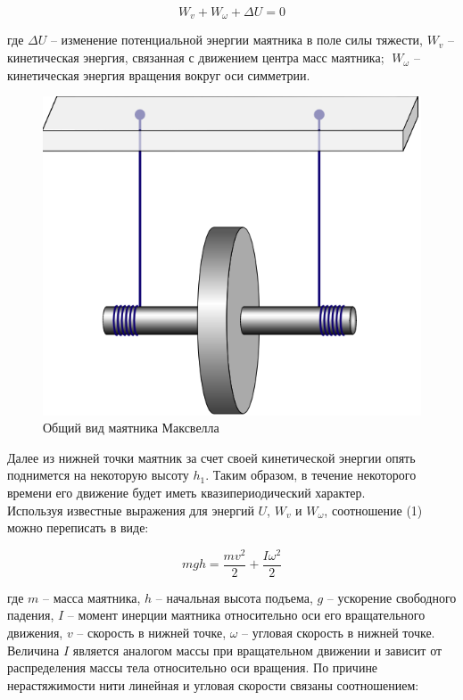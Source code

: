 \documentclass[a4paper]{article}
\begin{document}
\begin{equation}
    W_v+W_{\omega}+\Delta U=0
\end{equation}

где $\Delta U$ – изменение потенциальной энергии маятника в поле силы тяжести, $W_v$ – кинетическая энергия, связанная с движением центра масс маятника; $\; W_{\omega}$ – кинетическая энергия вращения вокруг оси симметрии.

\begin{figure}[h!]
    \centering
    \includegraphics[scale=0.5]{1.png}
    \caption{Общий вид маятника Максвелла}
\end{figure}

Далее из нижней точки маятник за счет своей кинетической
энергии опять поднимется на некоторую высоту $h_1$. Таким образом, в течение некоторого времени его движение будет иметь
квазипериодический характер.\\
Используя известные выражения для энергий $U$, $W_v$ и $W_{\omega}$,
соотношение (1) можно переписать в виде:

\begin{equation}
    mgh=\dfrac{mv^2}{2}+\dfrac{I\omega^2}{2}
\end{equation}



где $m$ – масса маятника, $h$ – начальная высота подъема, $g$ –
ускорение свободного падения, $I$ – момент инерции маятника
относительно оси его вращательного движения, $v$ – скорость в
нижней точке, $\omega$ – угловая скорость в нижней точке. Величина $I$ является аналогом массы при вращательном движении и зависит от распределения массы тела относительно оси вращения.
По причине нерастяжимости нити линейная и угловая скорости связаны соотношением:
\end{document}
